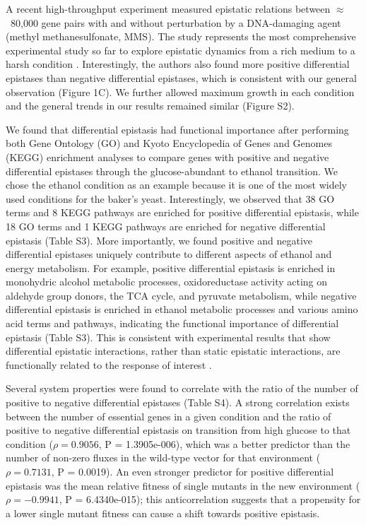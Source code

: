 A recent high-throughput experiment measured epistatic relations
between $\approx$~80,000 gene pairs with and without perturbation by a
DNA-damaging agent (methyl methanesulfonate, MMS). The study
represents the most comprehensive experimental study so far to explore
epistatic dynamics from a rich medium to a harsh condition
\citep{Bandyopadhyay2011}. Interestingly, the authors also found more
positive differential
epistases than negative differential epistases, which is consistent
with our general observation (Figure 1C). We further allowed maximum
growth in each condition and the general trends in our results
remained similar (Figure S2).

We found that differential epistasis had functional importance after
performing both Gene Ontology (GO) and Kyoto Encyclopedia of Genes and
Genomes (KEGG) enrichment analyses to compare genes with positive and
negative differential epistases through the glucose-abundant to
ethanol transition. We chose the ethanol condition as an example
because it is one of the most widely used conditions for the baker’s
yeast. Interestingly, we observed that 38 GO terms and 8 KEGG pathways
are enriched for positive differential epistasis, while 18 GO terms
and 1 KEGG pathways are enriched for negative differential epistasis
(Table S3). More importantly, we found positive and negative
differential epistases uniquely contribute to different aspects of
ethanol and energy metabolism. For example, positive differential
epistasis is enriched in monohydric alcohol metabolic processes,
oxidoreductase activity acting on aldehyde group donors, the TCA
cycle, and pyruvate metabolism, while negative differential epistasis
is enriched in ethanol metabolic processes and various amino acid
terms and pathways, indicating the functional importance of
differential epistasis (Table S3). This is consistent with
experimental results that show differential epistatic interactions,
rather than static epistatic interactions, are functionally related to
the response of interest \citep{Bandyopadhyay2011}.

Several system properties were found to correlate with the ratio of
the number of positive to negative differential epistases (Table
S4). A strong correlation exists between the number of essential genes
in a given condition and the ratio of positive to negative
differential epistasis on transition from high glucose to that
condition ($\rho = 0.9056$, P = 1.3905e-006), which was a better predictor
than the number of non-zero fluxes in the wild-type vector for that
environment ($\rho = 0.7131$, P = 0.0019). An even stronger predictor for
positive differential epistasis was the mean relative fitness of
single mutants in the new environment ($\rho = -0.9941$, P = 6.4340e-015);
this anticorrelation suggests that a propensity for a lower single
mutant fitness can cause a shift towards positive epistasis.

